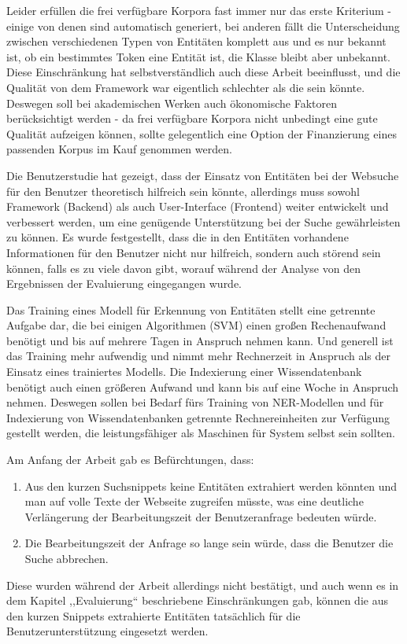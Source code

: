 Leider erfüllen die frei verfügbare Korpora fast immer nur das erste Kriterium - einige von denen sind automatisch generiert, bei anderen fällt die Unterscheidung zwischen verschiedenen Typen von Entitäten komplett aus und es nur bekannt ist, ob ein bestimmtes Token eine Entität ist, die Klasse bleibt aber unbekannt. Diese Einschränkung hat selbstverständlich auch diese Arbeit beeinflusst, und die Qualität von dem Framework war eigentlich schlechter als die sein könnte. Deswegen soll bei akademischen Werken auch ökonomische Faktoren berücksichtigt werden - da frei verfügbare Korpora nicht unbedingt eine gute Qualität aufzeigen können, sollte gelegentlich eine Option der Finanzierung eines passenden Korpus im Kauf genommen werden. 

Die Benutzerstudie hat gezeigt, dass der Einsatz von Entitäten bei der Websuche für den Benutzer theoretisch hilfreich sein könnte, allerdings muss sowohl Framework (Backend) als auch User-Interface (Frontend) weiter entwickelt und verbessert werden, um eine genügende Unterstützung bei der Suche gewährleisten zu können. Es wurde festgestellt, dass die in den Entitäten vorhandene Informationen für den Benutzer nicht nur hilfreich, sondern auch störend sein können, falls es zu viele davon gibt, worauf während der Analyse von den Ergebnissen der Evaluierung eingegangen wurde.

Das Training eines Modell für Erkennung von Entitäten stellt eine getrennte Aufgabe dar, die bei einigen Algorithmen (SVM) einen großen Rechenaufwand benötigt und bis auf mehrere Tagen in Anspruch nehmen kann. Und generell ist das Training mehr aufwendig und nimmt mehr Rechnerzeit in Anspruch als der Einsatz eines trainiertes Modells. Die Indexierung einer Wissendatenbank benötigt auch einen größeren Aufwand und kann bis auf eine Woche in Anspruch nehmen. Deswegen sollen bei Bedarf fürs Training von NER-Modellen und für Indexierung von Wissendatenbanken getrennte Rechnereinheiten zur Verfügung gestellt werden, die leistungsfähiger als Maschinen für System selbst sein sollten.  

Am Anfang der Arbeit gab es Befürchtungen, dass:
\begin{enumerate}
\item Aus den kurzen Suchsnippets keine Entitäten extrahiert werden könnten und man auf volle Texte der Webseite zugreifen müsste, was eine deutliche Verlängerung der Bearbeitungszeit der Benutzeranfrage bedeuten würde.
\item Die Bearbeitungszeit der Anfrage so lange sein würde, dass die Benutzer die Suche abbrechen.
\end{enumerate}
Diese wurden während der Arbeit allerdings nicht bestätigt, und auch wenn es in dem Kapitel ,,Evaluierung`` beschriebene Einschränkungen gab, können die aus den kurzen Snippets extrahierte Entitäten tatsächlich für die Benutzerunterstützung eingesetzt werden. 

